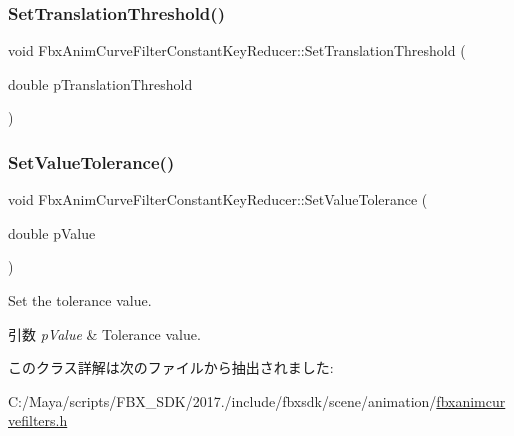 \mbox{\label{class_fbx_anim_curve_filter_constant_key_reducer_acc31edd257d4b94cc91a899b7d45deb2}} 
\subsubsection{\texorpdfstring{Set\+Translation\+Threshold()}{SetTranslationThreshold()}}
{\footnotesize\ttfamily void Fbx\+Anim\+Curve\+Filter\+Constant\+Key\+Reducer\+::\+Set\+Translation\+Threshold (\begin{DoxyParamCaption}\item[{double}]{p\+Translation\+Threshold }\end{DoxyParamCaption})}

\mbox{\label{class_fbx_anim_curve_filter_constant_key_reducer_a86a4427b2a29f5a82a0d1535048a44eb}} 
\subsubsection{\texorpdfstring{Set\+Value\+Tolerance()}{SetValueTolerance()}}
{\footnotesize\ttfamily void Fbx\+Anim\+Curve\+Filter\+Constant\+Key\+Reducer\+::\+Set\+Value\+Tolerance (\begin{DoxyParamCaption}\item[{double}]{p\+Value }\end{DoxyParamCaption})}

Set the tolerance value. 
\begin{DoxyParams}{引数}
{\em p\+Value} & Tolerance value. \\
\hline
\end{DoxyParams}


このクラス詳解は次のファイルから抽出されました\+:\begin{DoxyCompactItemize}
\item 
C\+:/\+Maya/scripts/\+F\+B\+X\+\_\+\+S\+D\+K/2017./include/fbxsdk/scene/animation/\hyperlink{fbxanimcurvefilters_8h}{fbxanimcurvefilters.\+h}\end{DoxyCompactItemize}
